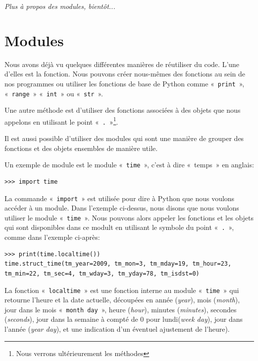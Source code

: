 \emph{Plus à propos des modules, bientôt...}

\section{Modules}
Nous avons déjà vu quelques différentes manières de réutiliser du code. L'une d'elles est la fonction. Nous pouvons créer nous-mêmes des fonctions au sein de nos programmes ou utiliser les fonctions de base de Python comme «~\texttt{print}~», «~\texttt{range}~» «~\texttt{int}~» ou «~\texttt{str}~». 

Une autre méthode est d'utiliser des fonctions associées à des objets que nous appelons en utilisant le point «~\texttt{.}~»\footnote{Nous verrons ultérieurement les méthodes}.
 
Il est aussi possible d'utiliser des modules qui sont une manière de grouper des fonctions et des objets ensembles de manière utile.

Un exemple de module est le module «~\texttt{time}~», c'est à dire «~temps~»   en anglais:

\begin{Verbatim}[frame=single,rulecolor=\color{mbleu}, label=à taper]
>>> import time
\end{Verbatim}

La commande «~\texttt{import}~» est utilisée pour dire à Python que nous voulons accéder à un module.
Dans l'exemple ci-dessus, nous disons que nous voulons utiliser le module «~\texttt{time}~».
Nous pouvons alors appeler les fonctions et les objets qui sont disponibles dans ce modult en utilisant le symbole du point «~\texttt{.}~», comme dans l'exemple ci-après:

\begin{Verbatim}[frame=single,rulecolor=\color{mbleu}, label=à taper]
>>> print(time.localtime())
time.struct_time(tm_year=2009, tm_mon=3, tm_mday=19, tm_hour=23, 
tm_min=22, tm_sec=4, tm_wday=3, tm_yday=78, tm_isdst=0)
\end{Verbatim}

La fonction «~\texttt{localtime}~» est une fonction interne au module «~\texttt{time}~» qui retourne l'heure et la date actuelle, découpées en année (\emph{year}), mois (\emph{month}), jour dans le mois «~\texttt{month day}~», heure (\emph{hour}), minutes (\emph{minutes}), secondes (\emph{seconds}), jour dans la semaine à compté de 0 pour lundi(\emph{week day}), jour dans l'année (\emph{year day}), et une indication d'un éventuel ajustement de l'heure).

